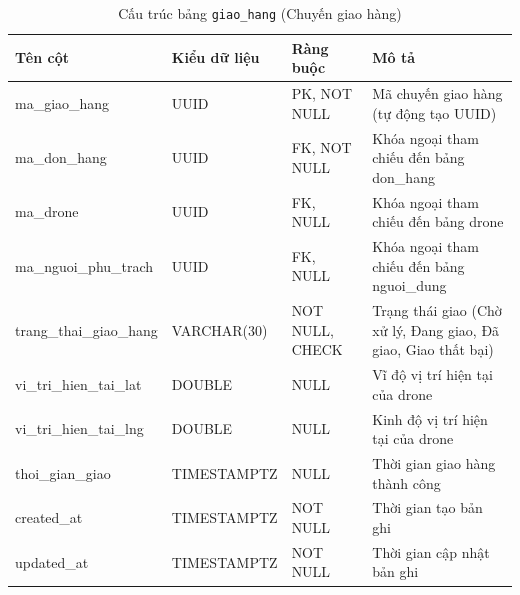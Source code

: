\begin{table}[H]
  \centering
  \begin{tabularx}{\textwidth}{|l|l|l|>{\raggedright\arraybackslash}X|}
    \hline
    \textbf{Tên cột} & \textbf{Kiểu dữ liệu} & \textbf{Ràng buộc} & \textbf{Mô tả} \\
    \hline
    ma\_giao\_hang       & UUID            & PK, NOT NULL    & Mã chuyến giao hàng (tự động tạo UUID) \\ \hline
    ma\_don\_hang        & UUID            & FK, NOT NULL    & Khóa ngoại tham chiếu đến bảng don\_hang \\ \hline
    ma\_drone            & UUID            & FK, NULL        & Khóa ngoại tham chiếu đến bảng drone \\ \hline
    ma\_nguoi\_phu\_trach & UUID            & FK, NULL        & Khóa ngoại tham chiếu đến bảng nguoi\_dung \\ \hline
    trang\_thai\_giao\_hang & VARCHAR(30)     & NOT NULL, CHECK & Trạng thái giao (Chờ xử lý, Đang giao, Đã giao, Giao thất bại) \\ \hline
    vi\_tri\_hien\_tai\_lat & DOUBLE          & NULL            & Vĩ độ vị trí hiện tại của drone \\ \hline
    vi\_tri\_hien\_tai\_lng & DOUBLE          & NULL            & Kinh độ vị trí hiện tại của drone \\ \hline
    thoi\_gian\_giao     & TIMESTAMPTZ     & NULL            & Thời gian giao hàng thành công \\ \hline
    created\_at          & TIMESTAMPTZ     & NOT NULL        & Thời gian tạo bản ghi \\ \hline
    updated\_at          & TIMESTAMPTZ     & NOT NULL        & Thời gian cập nhật bản ghi \\
    \hline
  \end{tabularx}
  \caption{Cấu trúc bảng \texttt{giao\_hang} (Chuyến giao hàng)}
  \label{tab:db-giao-hang}
\end{table}

